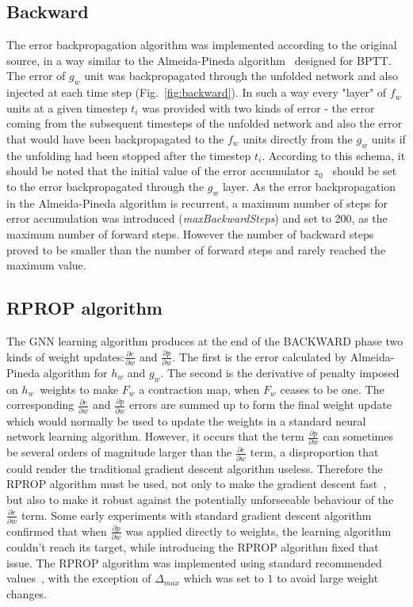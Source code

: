 \documentclass[]{spie}  %
\begin{document}
\subsection{Backward}
The error backpropagation algorithm was implemented according to the original source, in a way similar to the Almeida-Pineda algorithm~\cite{williams1995gradient} designed for BPTT. The error of $g_w$ unit was backpropagated through the unfolded network and also injected at each time step (Fig.~\ref{fig:backward}). In such a way every "layer" of $f_w$ units at a given timestep $t_i$ was provided with two kinds of error - the error coming from the subsequent timesteps of the unfolded network and also the error that would have been backpropagated to the $f_w$ units directly from the $g_w$ units if the unfolding had been stopped after the timestep $t_i$. According to this schema, it should be noted that the initial value of the error accumulator $z_0$~\cite{scarselli2009graph} should be set to the error backpropagated through the $g_w$ layer. As the error backpropagation in the Almeida-Pineda algorithm is recurrent, a maximum number of steps for error accumulation was introduced (\emph{maxBackwardSteps}) and set to 200, as the maximum number of forward steps. However the number of backward steps proved to be smaller than the number of forward steps and rarely reached the maximum value.

\subsection{RPROP algorithm}
The GNN learning algorithm produces at the end of the BACKWARD phase two kinds of weight updates:$\frac{\partial e}{\partial w}$ and $\frac{\partial p}{\partial w}$. The first is the error calculated by Almeida-Pineda algorithm for $h_w$ and $g_w$. The second is the derivative of penalty imposed on $h_w$~weights to make $F_w$ a contraction map, when $F_w$ ceases to be one. The corresponding $\frac{\partial e}{\partial w}$ and $\frac{\partial p}{\partial w}$ errors are summed up to form the final weight update which would normally be used to update the weights in a standard neural network learning algorithm. However, it occurs that the term $\frac{\partial p}{\partial w}$ can sometimes be several orders of magnitude larger than the $\frac{\partial e}{\partial w}$ term, a disproportion that could render the traditional gradient descent algorithm useless. Therefore the RPROP algorithm must be used, not only to make the gradient descent fast~\cite{scarselli2009graph}, but also to make it robust against the potentially unforseeable behaviour of the  $\frac{\partial e}{\partial w}$ term. Some early experiments with standard gradient descent algorithm confirmed that when $\frac{\partial p}{\partial w}$ was applied directly to weights, the learning algorithm couldn't reach its target, while introducing the RPROP algorithm fixed that issue. The RPROP algorithm was implemented using standard recommended values~\cite{riedmiller1993direct}, with the exception of $\Delta_{max}$ which was set to $1$ to avoid large weight changes.
\end{document}
